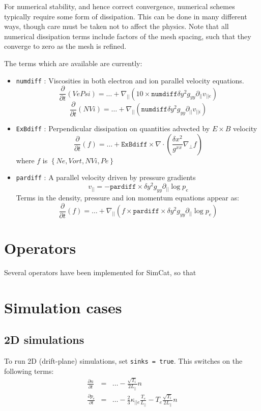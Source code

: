 \documentclass[12pt,a4paper]{article}
\newcommand{\deriv}[2]{\frac{\partial #1}{\partial #2}}
\begin{document}
For numerical stability, and hence correct convergence, numerical schemes
typically require some form of dissipation. This can be done in many different ways,
though care must be taken not to affect the physics. Note that
all numerical dissipation terms include factors of the mesh spacing,
such that they converge to zero as the mesh is refined.

The terms which are available are currently:
\begin{itemize}
\item \texttt{numdiff} : Viscosities in both electron and ion parallel velocity equations.
  \[
  \frac{\partial}{\partial t} \left(VePsi\right) = \ldots + \nabla_{||}\left(10\times\texttt{numdiff}\delta y^2g_{yy}\partial_{||}v_{||e}\right)
  \]
  \[
  \frac{\partial}{\partial t} \left(NVi\right) = \ldots + \nabla_{||}\left(\texttt{numdiff}\delta y^2g_{yy}\partial_{||}v_{||i}\right)
  \]
\item \texttt{ExBdiff} : Perpendicular dissipation on quantities advected by $E\times B$ velocity
  \[
  \frac{\partial}{\partial t} \left(f\right) = \ldots + \texttt{ExBdiff}\times\nabla\cdot\left(\frac{\delta x^2}{g^{xx}} \nabla_\perp f\right)
  \]
  where $f$ is $\left\{Ne, Vort, NVi, Pe\right\}$
\item \texttt{pardiff} : A parallel velocity driven by pressure gradients
  \[
  v_{||} = -\texttt{pardiff}\times \delta y^2g_{yy}\partial_{||}\log p_e
  \]
  Terms in the density, pressure and ion momentum equations appear as:
  \[
  \frac{\partial}{\partial t} \left(f\right) = \ldots + \nabla_{||}\left(f \times \texttt{pardiff}\times \delta y^2g_{yy}\partial_{||}\log p_e\right)
  \]
\end{itemize}

\section{Operators}
\label{sec:operators}

Several operators have been implemented for SimCat, so that


\section{Simulation cases}

\subsection{2D simulations}

To run 2D (drift-plane) simulations, set \texttt{sinks = true}. This 
switches on the following terms:
\begin{eqnarray}
  \deriv{n}{t} &=& \ldots - \frac{\sqrt{T_i}}{2L_{||}}n \\
  \deriv{p_e}{t} &=& \ldots - \frac{2}{3}\kappa_{||e} \frac{T_e}{L_{||}} - T_e \frac{\sqrt{T_i}}{2L_{||}}n
\end{eqnarray}
\end{document}
